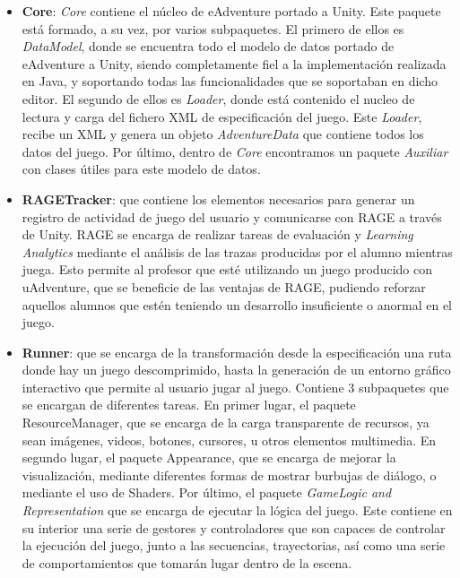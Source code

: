 \begin{itemize}
	\item \textbf{Core}: \textit{Core} contiene el núcleo de eAdventure portado a Unity. Este paquete está formado, a su vez, por varios subpaquetes. El primero de ellos es \textit{DataModel}, donde se encuentra todo el modelo de datos portado de eAdventure a Unity, siendo completamente fiel a la implementación realizada en Java, y soportando todas las funcionalidades que se soportaban en dicho editor. El segundo de ellos es \textit{Loader}, donde está contenido el nucleo de lectura y carga del fichero XML de especificación del juego. Este \textit{Loader}, recibe un XML y genera un objeto \textit{AdventureData} que contiene todos los datos del juego. Por último, dentro de \textit{Core} encontramos un paquete \textit{Auxiliar} con clases útiles para este modelo de datos.
	
	\item \textbf{RAGETracker}: que contiene los elementos necesarios para generar un registro de actividad de juego del usuario y comunicarse con RAGE a través de Unity. RAGE se encarga de realizar tareas de evaluación y \textit{Learning Analytics} mediante el análisis de las trazas producidas por el alumno mientras juega. Esto permite al profesor que esté utilizando un juego producido con uAdventure, que se beneficie de las ventajas de RAGE, pudiendo reforzar aquellos alumnos que estén teniendo un desarrollo insuficiente o anormal en el juego.
	
	\item \textbf{Runner}: que se encarga de la transformación desde la especificación una ruta donde hay un juego descomprimido, hasta la generación de un entorno gráfico interactivo que permite al usuario jugar al juego. Contiene 3 subpaquetes que se encargan de diferentes tareas. En primer lugar, el paquete ResourceManager, que se encarga de la carga transparente de recursos, ya sean imágenes, videos, botones, cursores, u otros elementos multimedia. En segundo lugar, el paquete Appearance, que se encarga de mejorar la visualización, mediante diferentes formas de mostrar burbujas de diálogo, o mediante el uso de Shaders. Por último, el paquete \textit{GameLogic and Representation} que se encarga de ejecutar la lógica del juego. Este contiene en su interior una serie de gestores y controladores que son capaces de controlar la ejecución del juego, junto a las secuencias, trayectorias, así como una serie de comportamientos que tomarán lugar dentro de la escena.
\end{itemize}


